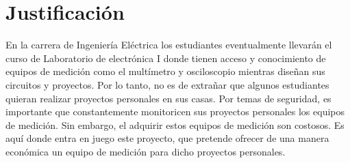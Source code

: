 \section{Justificación}
En la carrera de Ingeniería Eléctrica los estudiantes eventualmente llevarán el curso de Laboratorio de electrónica I donde tienen acceso y conocimiento de equipos de medición como el multímetro y osciloscopio mientras diseñan sus circuitos y proyectos. Por lo tanto, no es de extrañar que algunos estudiantes quieran realizar proyectos personales en sus casas. Por temas de seguridad, es importante que constantemente monitoricen sus proyectos personales los equipos de medición. Sin embargo, el adquirir estos equipos de medición son costosos. Es aquí donde entra en juego este proyecto, que pretende ofrecer de una manera económica un equipo de medición para dicho proyectos personales.